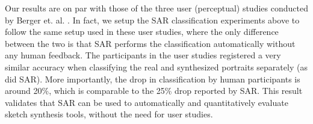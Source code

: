 Our results are on par with those of the three user (perceptual) studies conducted by Berger et. al. . In fact, we setup the SAR classification experiments above to follow the same setup used in these user studies, where the only difference between the two is that SAR performs the classification automatically without any human feedback. The participants in the user studies registered a very similar accuracy when classifying the real and synthesized portraits separately (as did SAR). More importantly, the drop in classification by human participants is around 20\%, which is comparable to the 25\% drop reported by SAR. This result validates that SAR can be used to automatically and quantitatively evaluate sketch synthesis tools, without the need for user studies.





